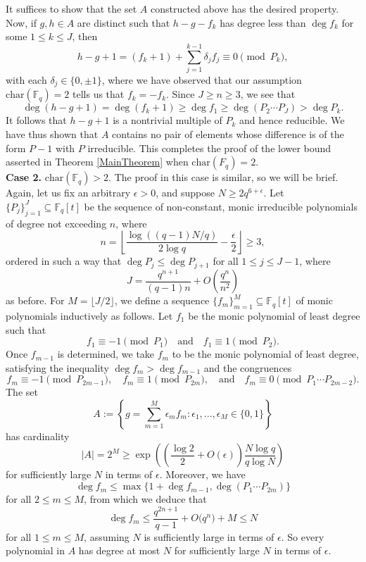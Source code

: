 \documentclass{article}
\theoremstyle{definition}
\theoremstyle{definition}
\theoremstyle{remark}
\newcommand{\F}{\mathbb{F}_q[t]}
\newcommand{\1}{\mathbf{1}}
\numberwithin{equation}{section}
\begin{document}
It suffices to show that the set $A$ constructed above has the desired property. Now, if $g,h\in A$ are distinct such that $h-g-f_k$ has degree less than $\deg f_k$ for some $1\le k\le J$, then 
\[h-g+1=(f_k+1)+\sum_{j=1}^{k-1}\delta_jf_j\equiv 0\pmod{P_k},\]
with each $\delta_j\in\{0,\pm1\}$, where we have observed that our assumption $\text{char}(\mathbb{F}_q)=2$ tells us that $f_k=-f_k$. Since $J\ge n\ge3$, we see that
\[\deg(h-g+1)=\deg(f_k+1)\ge\deg f_1\ge\deg(P_2\cdots P_{J})>\deg P_k.\]
It follows that $h-g+1$ is a nontrivial multiple of $P_k$ and hence reducible. We have thus shown that $A$ contains no pair of elements whose difference is of the form $P-1$ with $P$ irreducible. This completes the proof of the lower bound asserted in Theorem \ref{MainTheorem} when $\text{char}(F_q)=2$. \\


\textbf{Case 2.} $\text{char}(\mathbb{F}_q)>2$. The proof in this case is similar, so we will be brief. Again, let us fix an arbitrary $\epsilon>0$, and suppose $N\ge 2q^{6+\epsilon}$. Let $\{P_j\}_{j=1}^{J}\subseteq\F$ be the sequence of non-constant, monic irreducible polynomials of degree not exceeding $n$, where
\[n=\left\lfloor\frac{\log((q-1)N/q)}{2\log q}-\frac{\epsilon}{2}\right\rfloor\ge3,\] 
ordered in such a way that $\deg P_j\le\deg P_{j+1}$ for all $1\le j\le J-1$, where 
\[J=\frac{q^{n+1}}{(q-1)n}+O\left(\frac{q^{n}}{n^2}\right)\] 
as before. For $M=\lfloor J/2\rfloor$, we define a sequence $\{f_m\}_{m=1}^{M}\subseteq\F$ of monic polynomials inductively as follows. Let $f_1$ be the monic polynomial of least degree such that 
\[f_1\equiv -1\pmod{P_1}\quad\text{and}\quad f_1\equiv 1\pmod{P_2}.\]
Once $f_{m-1}$ is determined, we take $f_{m}$ to be the monic polynomial of least degree, satisfying the inequality $\deg f_{m}>\deg f_{m-1}$ and the congruences
\[f_{m}\equiv -1\pmod{P_{2m-1}},\quad f_{m}\equiv 1\pmod{P_{2m}},\quad\text{and}\quad f_{m}\equiv 0\pmod{P_{1}\cdots P_{2m-2}}.\]
The set
\[A:=\left\{g=\sum_{m=1}^{M}\epsilon_mf_m\colon\epsilon_1,...,\epsilon_M\in\{0,1\}\right\}\]
has cardinality
\[|A|=2^M\ge\exp\left(\left(\frac{\log2}{2}+O(\epsilon)\right)\frac{N\log q}{q\log N}\right)\]
for sufficiently large $N$ in terms of $\epsilon$. Moreover, we have
\[\deg f_{m}\le\max\{1+\deg f_{m-1},\deg(P_1\cdots P_{2m})\}\]
for all $2\le m\le M$, from which we deduce that
\[\deg f_{m}\le\frac{q^{2n+1}}{q-1}+O\big(q^{n}\big)+M\le N\]
for all $1\le m\le M$, assuming $N$ is sufficiently large in terms of $\epsilon$. So every polynomial in $A$ has degree at most $N$ for sufficiently large $N$ in terms of $\epsilon$. 
\end{document}
